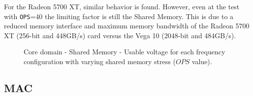 For the Radeon 5700 XT, similar behavior is found. However, even at the test with \texttt{OPS}=40 the limiting factor is still the Shared Memory. This is due to a reduced memory interface and maximum memory bandwidth of the Radeon 5700 XT (256-bit and 448GB/s) card versus the Vega 10 (2048-bit and 484GB/s).


\begin{figure}[!htb]
    \centering
    \begin{subfigmatrix}{2}
      \label{fig:SharedMemory_guardband}
    \end{subfigmatrix}
    \caption{Core domain - Shared Memory - Usable voltage for each frequency configuration with varying shared memory stress ($OPS$ value).}
\end{figure}

\subsection{MAC}

